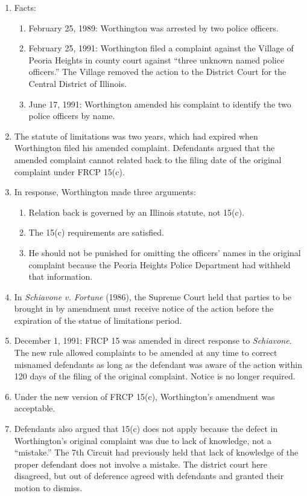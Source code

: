 \begin{enumerate}
    \item Facts:
    \begin{enumerate}
        \item February 25, 1989: Worthington was arrested by two police officers.
        \item February 25, 1991: Worthington filed a complaint against the Village of Peoria Heights in county court against ``three unknown named police officers.'' The Village removed the action to the District Court for the Central District of Illinois.
        \item June 17, 1991: Worthington amended his complaint to identify the two police officers by name.
    \end{enumerate}
    \item The statute of limitations was two years, which had expired when Worthington filed his amended complaint. Defendants argued that the amended complaint cannot related back to the filing date of the original complaint under FRCP 15(c).
    \item In response, Worthington made three arguments:
    \begin{enumerate}
        \item Relation back is governed by an Illinois statute, not 15(c).
        \item The 15(c) requirements are satisfied.
        \item He should not be punished for omitting the officers' names in the original complaint because the Peoria Heights Police Department had withheld that information.
    \end{enumerate}
    \item In \emph{Schiavone v. Fortune} (1986), the Supreme Court held that parties to be brought in by amendment must receive notice of the action before the expiration of the statue of limitations period.
    \item December 1, 1991: FRCP 15 was amended in direct response to \emph{Schiavone}. The new rule allowed complaints to be amended at any time to correct misnamed defendants as long as the defendant was aware of the action within 120 days of the filing of the original complaint. Notice is no longer required.
    \item Under the new version of FRCP 15(c), Worthington's amendment was acceptable.
    \item Defendants also argued that 15(c) does not apply because the defect in Worthington's original complaint was due to lack of knowledge, not a ``mistake.'' The 7th Circuit had previously held that lack of knowledge of the proper defendant does not involve a mistake. The district court here disagreed, but out of deference agreed with defendants and granted their motion to dismiss.
\end{enumerate}




